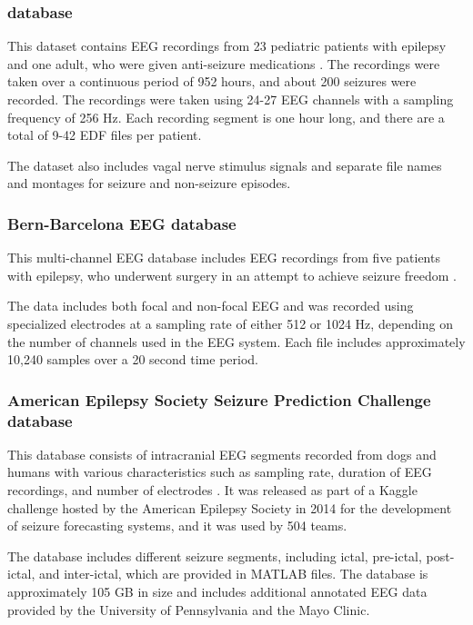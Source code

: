 \subsubsection{ database}
This dataset contains \gls{EEG} recordings from 23 pediatric patients with epilepsy and one adult, who were given anti-seizure medications \cite{shoeb_application_2009, shoeb_chb-mit_2010}. The recordings were taken over a continuous period of 952 hours, and about 200 seizures were recorded. The recordings were taken using 24-27 \gls{EEG} channels with a sampling frequency of 256 Hz. Each recording segment is one hour long, and there are a total of 9-42 \gls{EDF} files per patient. 

The dataset also includes vagal nerve stimulus signals and separate file names and montages for seizure and non-seizure episodes.

\subsubsection{Bern-Barcelona EEG database}
This multi-channel \gls{EEG} database includes \gls{EEG} recordings from five patients with epilepsy, who underwent surgery in an attempt to achieve seizure freedom \cite{andrzejak_nonrandomness_2012}. 

The data includes both focal and non-focal \gls{EEG} and was recorded using specialized electrodes at a sampling rate of either 512 or 1024 Hz, depending on the number of channels used in the \gls{EEG} system. Each file includes approximately 10,240 samples over a 20 second time period.

\subsubsection{American Epilepsy Society Seizure Prediction Challenge database}
This database consists of intracranial \gls{EEG} segments recorded from dogs and humans with various characteristics such as sampling rate, duration of \gls{EEG} recordings, and number of electrodes \cite{howbert_forecasting_2014}. It was released as part of a Kaggle challenge hosted by the American Epilepsy Society in 2014 for the development of seizure forecasting systems, and it was used by 504 teams. 

The database includes different seizure segments, including ictal, pre-ictal, post-ictal, and inter-ictal, which are provided in MATLAB files. The database is approximately 105 GB in size and includes additional annotated \gls{EEG} data provided by the University of Pennsylvania and the Mayo Clinic.

